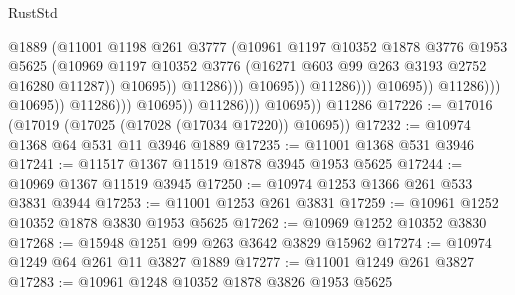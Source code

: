 \begin{lexlean}{RustStd}
\begin{coremodule}
                                                      @1889
                                                      (@11001
                                                        @1198
                                                        @261
                                                        @3777
                                                        (@10961
                                                          @1197
                                                          @10352
                                                          @1878
                                                          @3776
                                                          @1953
                                                          @5625
                                                          (@10969
                                                            @1197
                                                            @10352
                                                            @3776
                                                            (@16271
                                                              @603
                                                              @99
                                                              @263
                                                              @3193
                                                              @2752
                                                              @16280
                                                              @11287))
                                                          @10695))
                                                      @11286)))
                                                @10695))
                                            @11286)))
                                      @10695))
                                  @11286)))
                            @10695))
                        @11286)))
                  @10695))
              @11286)))
        @10695))
    @11286
@17226 := @17016 (@17019 (@17025 (@17028 (@17034 @17220)) @10695))
@17232 := @10974 @1368 @64 @531 @11 @3946 @1889
@17235 := @11001 @1368 @531 @3946
@17241 := @11517 @1367 @11519 @1878 @3945 @1953 @5625
@17244 := @10969 @1367 @11519 @3945
@17250 := @10974 @1253 @1366 @261 @533 @3831 @3944
@17253 := @11001 @1253 @261 @3831
@17259 := @10961 @1252 @10352 @1878 @3830 @1953 @5625
@17262 := @10969 @1252 @10352 @3830
@17268 := @15948 @1251 @99 @263 @3642 @3829 @15962
@17274 := @10974 @1249 @64 @261 @11 @3827 @1889
@17277 := @11001 @1249 @261 @3827
@17283 := @10961 @1248 @10352 @1878 @3826 @1953 @5625

\end{coremodule}
\end{lexlean}
